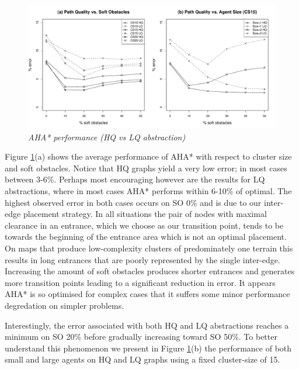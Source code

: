 \begin{figure}[htbp]
	\vspace{-12pt}
	\caption{\small{\emph{AHA* performance (HQ vs LQ abstraction)}}}
	\begin{center}
		       \includegraphics[scale=0.25, trim = 20mm 17mm 20mm 5mm]{diagrams/pathquality.pdf}
	\end{center}
	\label{aha-fig:pathquality}
	\vspace{-5pt}
\end{figure}
\par \indent
Figure \ref{aha-fig:pathquality}(a) shows the average performance of AHA* with respect to cluster size and soft obstacles.  
Notice that HQ graphs yield a very low error; in most cases between 3-6\%. 
Perhaps most encouraging however are the results for LQ abstractions, where in most cases AHA* performs within 6-10\% of optimal. 
The highest observed error in both cases occurs on SO 0\% and is due to our inter-edge placement strategy.
In all situations the pair of nodes with maximal clearance in an entrance, which we choose as our transition point, tends to be towards the beginning of the entrance area which is not an optimal placement.
On maps that produce low-complexity clusters of predominately one terrain this results in long entrances that are poorly represented by the single inter-edge.
Increasing the amount of soft obstacles produces shorter entrances and generates more transition points leading to a significant reduction in error. 
It appears AHA* is so optimised for complex cases that it suffers some minor performance degredation on simpler problems. 
\par \indent
Interestingly, the error associated with both HQ and LQ abstractions reaches a minimum on SO 20\% before gradually increasing toward SO 50\%. 
To better understand this phenomenon we present in Figure \ref{aha-fig:pathquality}(b) the performance of both small and large agents on HQ and LQ graphs using a fixed cluster-size of 15.
